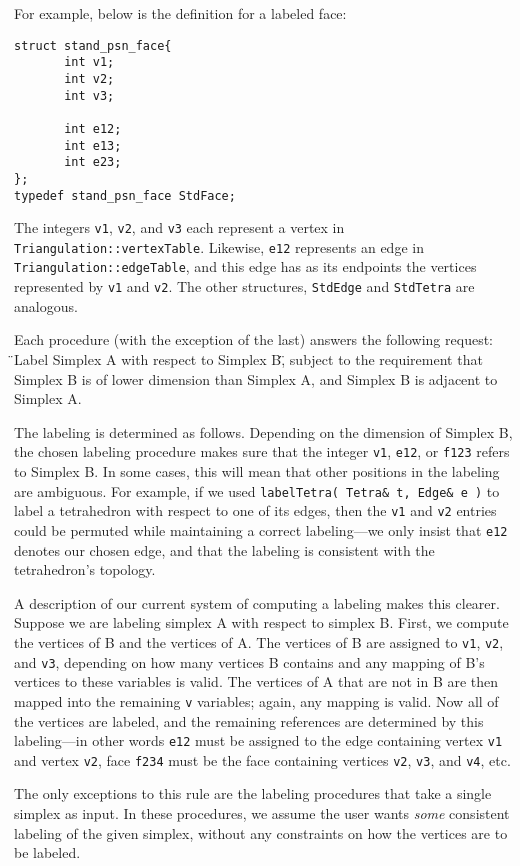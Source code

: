 \documentclass[12pt]{article}%
\begin{document}
For example, below is the definition for a labeled face:
\begin{verbatim} 
struct stand_psn_face{
       int v1;
       int v2;
       int v3;

       int e12;
       int e13;
       int e23;
};
typedef stand_psn_face StdFace;
\end{verbatim}
The integers \texttt{v1}, \texttt{v2}, and \texttt{v3} each represent a vertex in \texttt{Triangulation::vertexTable}. Likewise, \texttt{e12} represents an edge in \texttt{Triangulation::edgeTable}, and this edge has as its endpoints the vertices represented by \texttt{v1} and \texttt{v2}. The other structures, \texttt{StdEdge} and \texttt{StdTetra} are analogous.

Each procedure (with the exception of the last) answers the following request: \"{}Label Simplex A with respect to Simplex B,\"{} subject to the requirement that Simplex B is of lower dimension than Simplex A, and Simplex B is adjacent to Simplex A.

The labeling is determined as follows. Depending on the dimension of Simplex B, the chosen labeling procedure makes sure that the integer \texttt{v1}, \texttt{e12}, or \texttt{f123} refers to Simplex B. In some cases, this will mean that other positions in the labeling are ambiguous. For example, if we used \texttt{labelTetra( Tetra\& t, Edge\& e )} to label a tetrahedron with respect to one of its edges, then the \texttt{v1} and \texttt{v2} entries could be permuted while maintaining a correct labeling---we only insist that \texttt{e12} denotes our chosen edge, and that the labeling is consistent with the tetrahedron's topology.

A description of our current system of computing a labeling makes this clearer. Suppose we are labeling simplex A with respect to simplex B. First, we compute the vertices of B and the vertices of A. The vertices of B are assigned to \texttt{v1}, \texttt{v2}, and \texttt{v3}, depending on how many vertices B contains and any mapping of B's vertices to these variables is valid. The vertices of A that are not in B are then mapped into the remaining \texttt{v} variables; again, any mapping is valid. Now all of the vertices are labeled, and the remaining references are determined by this labeling---in other words \texttt{e12} must be assigned to the edge containing vertex \texttt{v1} and vertex \texttt{v2}, face \texttt{f234} must be the face containing vertices \texttt{v2}, \texttt{v3}, and \texttt{v4}, etc.

The only exceptions to this rule are the labeling procedures that take a single simplex as input. In these procedures, we assume the user wants \textit{some} consistent labeling of the given simplex, without any constraints on how the vertices are to be labeled.
\end{document}
